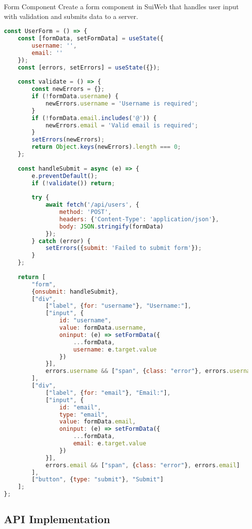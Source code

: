 \begin{example2}{Form Component}
Create a form component in SuiWeb that handles user input with validation and submits data to a server.

\begin{lstlisting}[language=JavaScript, style=basesmol]
const UserForm = () => {
    const [formData, setFormData] = useState({
        username: '',
        email: ''
    });
    const [errors, setErrors] = useState({});
    
    const validate = () => {
        const newErrors = {};
        if (!formData.username) {
            newErrors.username = 'Username is required';
        }
        if (!formData.email.includes('@')) {
            newErrors.email = 'Valid email is required';
        }
        setErrors(newErrors);
        return Object.keys(newErrors).length === 0;
    };
    
    const handleSubmit = async (e) => {
        e.preventDefault();
        if (!validate()) return;
        
        try {
            await fetch('/api/users', {
                method: 'POST',
                headers: {'Content-Type': 'application/json'},
                body: JSON.stringify(formData)
            });
        } catch (error) {
            setErrors({submit: 'Failed to submit form'});
        }
    };
    
    return [
        "form",
        {onsubmit: handleSubmit},
        ["div",
            ["label", {for: "username"}, "Username:"],
            ["input", {
                id: "username",
                value: formData.username,
                oninput: (e) => setFormData({
                    ...formData,
                    username: e.target.value
                })
            }],
            errors.username && ["span", {class: "error"}, errors.username]
        ],
        ["div",
            ["label", {for: "email"}, "Email:"],
            ["input", {
                id: "email",
                type: "email",
                value: formData.email,
                oninput: (e) => setFormData({
                    ...formData,
                    email: e.target.value
                })
            }],
            errors.email && ["span", {class: "error"}, errors.email]
        ],
        ["button", {type: "submit"}, "Submit"]
    ];
};
\end{lstlisting}
\end{example2}

\subsection{API Implementation}


